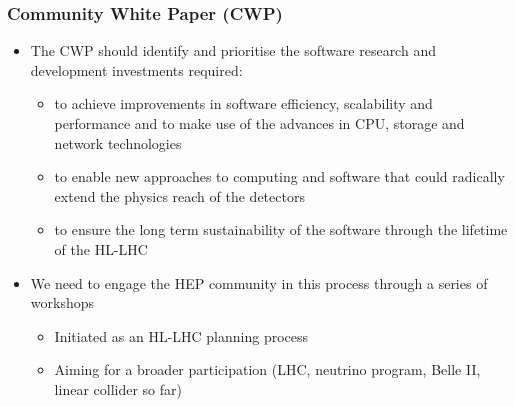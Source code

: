 \begin{frame}
\frametitle{Community White Paper (CWP)}

\begin{itemize}
\item The CWP should identify and prioritise the software research and development investments required:
   \begin{itemize} 
   \item to achieve improvements in software efficiency, scalability and performance and to make use of the advances in CPU, storage and network technologies
   \item to enable new approaches to computing and software that could radically extend the physics reach of the detectors
   \item to ensure the long term sustainability of the software through the lifetime of the HL-LHC
   \end{itemize} 
\vskip 0.15in
\item We need to engage the HEP community in this process through a series of workshops
   \begin{itemize} 
   \item Initiated as an HL-LHC planning process
   \item Aiming for a broader participation (LHC, neutrino program, Belle II, linear collider so far)
   \end{itemize} 
\end{itemize}

\end{frame}


